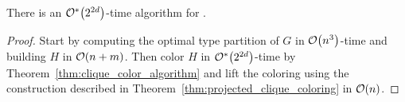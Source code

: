 \begin{theorem}
    \label{thm:fpt_clique}
    There is an $\mathcal{O}^*\!\left(2^{2d}\right)$-time algorithm for .
\end{theorem}

\begin{proof}
    Start by computing the optimal type partition of $G$ in $\mathcal{O}\!\left(n^3\right)$-time and building $H$ in $\mathcal{O}\!\left(n + m\right)$.
    Then color $H$ in $\mathcal{O}^*\!\left(2^{2d}\right)$-time by Theorem~\ref{thm:clique_color_algorithm} and lift the coloring using the construction described in Theorem~\ref{thm:projected_clique_coloring} in $\mathcal{O}\!\left(n\right)$.
\end{proof}
